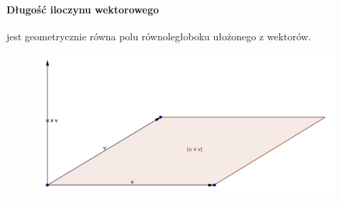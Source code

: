\documentclass [a4paper, 12pt, oneside]{article}
\begin{document}
\paragraph{Długość iloczynu wektorowego} jest geometrycznie równa polu równoległoboku ułożonego z wektorów.

\begin{figure}[h]
\begin{center}
\includegraphics[width=15cm]{Graphics/wektor3}
\end{center}
\end{figure}
\end{document}
